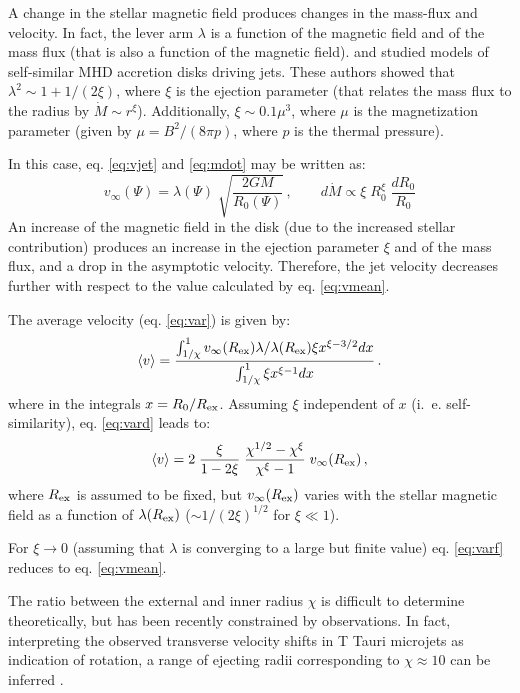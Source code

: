 \documentclass{emulateapj}
\begin{document}
A change in the stellar magnetic field produces
changes in the mass-flux and velocity.
In fact, the lever arm $\lambda$ is a function of the magnetic field
and of the mass flux (that is also a function of the magnetic field).
\citet{fer97} and \citet{cas00} studied models of self-similar
MHD accretion disks driving jets. These authors showed that 
$\lambda^2 \sim 1 + 1/(2 \xi)$, where $\xi$ is the ejection parameter
(that relates the mass flux to the radius by $\dot{M} \sim r^\xi$).
Additionally, $\xi \sim  0.1 \mu^3$, where $\mu$ is the magnetization parameter
(given by $\mu =B^2/(8 \pi p)$, where $p$ is the thermal pressure).

In this case, eq. \ref{eq:vjet} and \ref{eq:mdot}
may be written as:
%
\begin{equation}
  v_{\infty}(\Psi) 
  = \lambda(\Psi) \; \sqrt{\frac{2GM}{R_0(\Psi)}} \,, \qquad
 d\dot{M} \propto \xi \; R_0^\xi \; \frac{d R_0}{R_0} 
 \label{eq:mdotd}
\end{equation}
%
An increase of the magnetic field in the disk
(due to the increased stellar contribution)
produces an increase in the ejection parameter $\xi$ and of
the mass flux, and a drop in the asymptotic velocity.
Therefore, the jet velocity decreases further with respect
to the value calculated by eq. \ref{eq:vmean}.

The average velocity (eq. \ref{eq:var}) is given by:
%
\begin{equation}
 \langle v \rangle = \frac{\int_{1/\chi}^1 
         v_\infty(R_{\rm ex}) \lambda/\lambda(R_{\rm ex}) \xi x^{\xi-3/2} dx}
            {\int_{1/\chi}^1 \xi x^{\xi-1} dx} \,.
 \label{eq:vard}
\end{equation}
%
where in the integrals $x=R_0/R_{\rm{ex}}$.
Assuming $\xi$ independent of $x$ (i.~e. self-similarity), 
eq. \ref{eq:vard} leads to:
%
\begin{equation}
 \langle v \rangle = 2  \;
 \frac{\xi}{1-2\xi} \;
 \frac{\chi^{1/2}-\chi^{\xi}}{\chi^{\xi}-1} \;
 v_\infty(R_{\rm ex})
\,,
 \label{eq:varf}
\end{equation}
%
where $R_{\rm ex}$ is assumed to be fixed, but
$v_{\infty}(R_{\rm ex})$ varies with the stellar magnetic field
as a function of $\lambda(R_{\rm ex})$
($\sim 1/(2 \xi)^{1/2}$ for $\xi \ll 1$).

For $\xi \rightarrow 0$ (assuming that $\lambda$ is converging
to a large but finite value) eq. \ref{eq:varf} reduces to eq. \ref{eq:vmean}.

The ratio between the external and inner radius $\chi$ is difficult to
determine theoretically, but has been recently constrained
by observations.
In fact, interpreting the observed transverse velocity shifts
in T Tauri microjets as indication of rotation, a range of 
ejecting radii corresponding to $\chi \approx 10$ can be 
inferred \citep[e.g.][]{fer06}.
\end{document}

